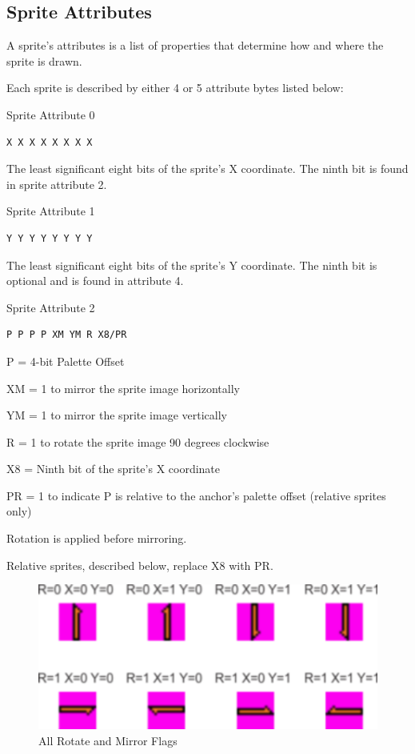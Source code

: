 \subsection{Sprite Attributes}
A sprite’s attributes is a list of properties that determine how and
where the sprite is drawn.

Each sprite is described by either 4 or 5 attribute bytes listed
below:

Sprite Attribute 0
\begin{verbatim}
X X X X X X X X
\end{verbatim}
The least significant eight bits of the sprite’s X coordinate. The
ninth bit is found in sprite attribute 2.

Sprite Attribute 1
\begin{verbatim}
Y Y Y Y Y Y Y Y
\end{verbatim}
The least significant eight bits of the sprite’s Y coordinate. The
ninth bit is optional and is found in attribute 4.

Sprite Attribute 2
\begin{verbatim}
P P P P XM YM R X8/PR
\end{verbatim}
P = 4-bit Palette Offset

XM = 1 to mirror the sprite image horizontally

YM = 1 to mirror the sprite image vertically

R = 1 to rotate the sprite image 90 degrees clockwise

X8 = Ninth bit of the sprite’s X coordinate

PR = 1 to indicate P is relative to the anchor’s palette offset
(relative sprites only)

Rotation is applied before mirroring.

Relative sprites, described below, replace X8 with PR.

\begin{figure}\centering
  \includegraphics{video/flags.png}
  \caption{All Rotate and Mirror Flags}
\end{figure}

